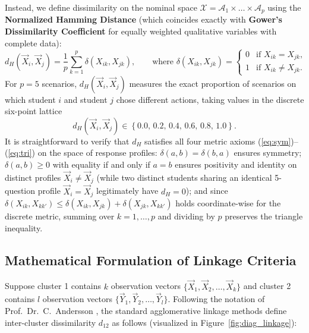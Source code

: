 \documentclass[11pt,a4paper]{article}
\begin{document}
Instead, we define dissimilarity on the nominal space $\mathcal{X} = \mathcal{A}_1 \times \dots \times \mathcal{A}_p$ using the \textbf{Normalized Hamming Distance} (which coincides exactly with \textbf{Gower's Dissimilarity Coefficient} \cite{gower1971} for equally weighted qualitative variables with complete data):
\begin{equation}
    d_H(\vec{X}_i, \vec{X}_j) = \frac{1}{p} \sum_{k=1}^{p} \delta(X_{ik}, X_{jk}), \qquad \text{where } \delta(X_{ik}, X_{jk}) = \begin{cases} 0 & \text{if } X_{ik} = X_{jk}, \\ 1 & \text{if } X_{ik} \neq X_{jk}. \end{cases}
    \label{eq:hamming}
\end{equation}
For $p = 5$ scenarios, $d_H(\vec{X}_i, \vec{X}_j)$ measures the exact proportion of scenarios on which student $i$ and student $j$ chose different actions, taking values in the discrete six-point lattice
\begin{equation}
    d_H(\vec{X}_i, \vec{X}_j) \in \left\{0.0,\, 0.2,\, 0.4,\, 0.6,\, 0.8,\, 1.0\right\}.
\end{equation}
It is straightforward to verify that $d_H$ satisfies all four metric axioms (\ref{eq:sym})--(\ref{eq:tri}) on the space of response profiles: $\delta(a,b) = \delta(b,a)$ ensures symmetry; $\delta(a,b) \ge 0$ with equality if and only if $a=b$ ensures positivity and identity on distinct profiles $\vec{X}_i \neq \vec{X}_j$ (while two distinct students sharing an identical 5-question profile $\vec{X}_i = \vec{X}_j$ legitimately have $d_H = 0$); and since $\delta(X_{ik}, X_{kk'}) \le \delta(X_{ik}, X_{jk}) + \delta(X_{jk}, X_{kk'})$ holds coordinate-wise for the discrete metric, summing over $k=1,\dots,p$ and dividing by $p$ preserves the triangle inequality.

\subsection{Mathematical Formulation of Linkage Criteria}
Suppose cluster 1 contains $k$ observation vectors $\{\vec{X}_1, \vec{X}_2, \dots, \vec{X}_k\}$ and cluster 2 contains $l$ observation vectors $\{\vec{Y}_1, \vec{Y}_2, \dots, \vec{Y}_l\}$. Following the notation of Prof.\ Dr.\ C.\ Andersson \cite{andersson2026}, the standard agglomerative linkage methods define inter-cluster dissimilarity $d_{12}$ as follows (visualized in Figure~\ref{fig:diag_linkage}):
\end{document}
